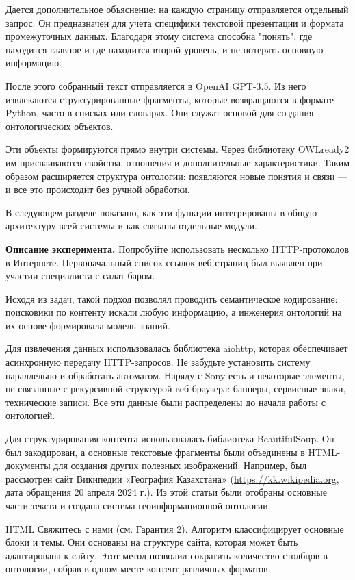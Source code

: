 \begin{multicols}{2}
Дается дополнительное объяснение: на каждую страницу отправляется
отдельный запрос. Он предназначен для учета специфики текстовой
презентации и формата промежуточных данных. Благодаря этому система
способна "понять", где находится главное и где находится второй уровень,
и не потерять основную информацию.

После этого собранный текст отправляется в OpenAI GPT-3.5. Из него
извлекаются структурированные фрагменты, которые возвращаются в формате
Python, часто в списках или словарях. Они служат основой для создания
онтологических объектов.

Эти объекты формируются прямо внутри системы. Через библиотеку OWLready2
им присваиваются свойства, отношения и дополнительные характеристики.
Таким образом расширяется структура онтологии: появляются новые понятия
и связи --- и все это происходит без ручной обработки.

В следующем разделе показано, как эти функции интегрированы в общую
архитектуру всей системы и как связаны отдельные модули.

{\bfseries Описание эксперимента.} Попробуйте использовать несколько
HTTP-протоколов в Интернете. Первоначальный список ссылок веб-страниц
был выявлен при участии специалиста с салат-баром.

Исходя из задач, такой подход позволял проводить семантическое
кодирование: поисковики по контенту искали любую информацию, а инженерия
онтологий на их основе формировала модель знаний.

Для извлечения данных использовалась библиотека aiohttp, которая
обеспечивает асинхронную передачу HTTP-запросов. Не забудьте установить
систему параллельно и обработать автоматом. Наряду с Sony есть и
некоторые элементы, не связанные с рекурсивной структурой веб-браузера:
баннеры, сервисные знаки, технические записи. Все эти данные были
распределены до начала работы с онтологией.

Для структурирования контента использовалась библиотека BeautifulSoup.
Он был закодирован, а основные текстовые фрагменты были объединены в
HTML-документы для создания других полезных изображений. Например, был
рассмотрен сайт Википедии «География Казахстана»
(\href{https://kk.wikipedia.org/wiki/Geography_of_Kazakhstan}{https://kk.wikipedia.org}, дата обращения
20 апреля 2024 г.). Из этой статьи были отобраны основные части текста и
создана система геоинформационной онтологии.

HTML Свяжитесь с нами (см. Гарантия 2). Алгоритм классифицирует основные
блоки и темы. Они основаны на структуре сайта, которая может быть
адаптирована к сайту. Этот метод позволил сократить количество столбцов
в онтологии, собрав в одном месте контент различных форматов.


\end{multicols}
